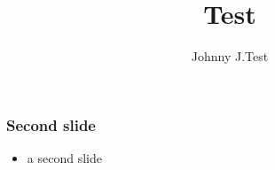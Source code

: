 \documentclass[compress,xcolor=dvipsname]{beamer}
\title{Test}
\author{Johnny J.Test}
\begin{document}
\begin{frame}
    \titlepage
\end{frame}

\begin{frame}
    \frametitle<+->{Second slide}

    \begin{itemize}
        \item a second slide
    \end{itemize}

\end{frame}
\end{document}
